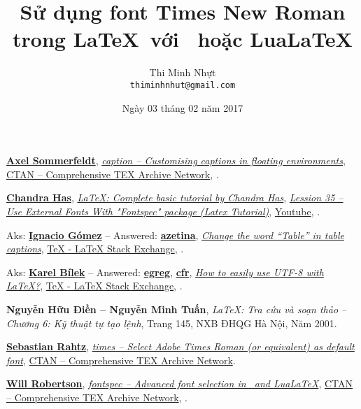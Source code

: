 \documentclass[12pt,a4paper]{article}
\title{\bfseries \huge Sử dụng font Times New Roman trong \LaTeX\ với \XeLaTeX\ hoặc Lua\LaTeX}
\author{\Large Thi Minh Nhựt \bigskip \\  \Large \texttt{thiminhnhut@gmail.com}}
\date{\Large Ngày 03 tháng 02 năm 2017}
\begin{document}
\maketitle
\tableofcontents

\begin{thebibliography}{}
	 \href{https://www.ctan.org/author/sommerfeldt}{\textbf{Axel Sommerfeldt}}, \href{https://www.ctan.org/pkg/caption}{\emph{caption – Customising captions in floating environments}}, \href{https://www.ctan.org/}{CTAN -- Comprehensive TEX Archive Network}, .
	
	 \href{https://goo.gl/quEV70}{\textbf{Chandra Has}}, \href{https://goo.gl/ljfpxm}{\emph{LaTeX: Complete basic tutorial by Chandra Has}}, \href{https://goo.gl/xiJ8hm}{\emph{Lession 35 -- Use External Fonts With "Fontspec" package (Latex Tutorial)}}, \href{https://www.youtube.com/}{Youtube}, .
	
	 Aks: \href{https://goo.gl/Iv3GDx}{\textbf{Ignacio Gómez}} -- Answered: \href{https://goo.gl/I4Lbvw}{\textbf{azetina}}, \href{https://goo.gl/2wcY14}{\emph{Change the word ``Table'' in table captions}}, \href{http://tex.stackexchange.com/}{TeX - LaTeX Stack Exchange}, .
		
	 Aks: \href{https://goo.gl/oHHZ2J}{\textbf{Karel Bílek}} -- Answered: \href{https://goo.gl/Wk6MGR}{\textbf{egreg}}, \href{https://goo.gl/JMexOO}{\textbf{cfr}}, \href{https://goo.gl/ITcJ7j}{\emph{How to easily use UTF-8 with LaTeX?}}, \href{http://tex.stackexchange.com/}{TeX - LaTeX Stack Exchange}, .
	
	 \textbf{Nguyễn Hữu Điền -- Nguyễn Minh Tuấn}, \emph{\LaTeX: Tra cứu và soạn thảo -- Chương 6: Kỹ thuật tự tạo lệnh}, Trang 145, NXB ĐHQG Hà Nội, Năm 2001.
		
	 \href{https://www.ctan.org/author/rahtz}{\textbf{Se­bas­tian Rahtz}}, \href{https://www.ctan.org/pkg/times}{\emph{times – Select Adobe Times Roman (or equivalent) as default font}}, \href{https://www.ctan.org/}{CTAN -- Comprehensive TEX Archive Network}.
		
	 \href{https://www.ctan.org/author/robertson}{\textbf{Will Robertson}}, \href{https://www.ctan.org/pkg/fontspec}{\emph{fontspec – Advanced font selection in \XeLaTeX\ and Lua\LaTeX}}, \href{https://www.ctan.org/}{CTAN -- Comprehensive TEX Archive Network}, .
\end{thebibliography}
\end{document}
